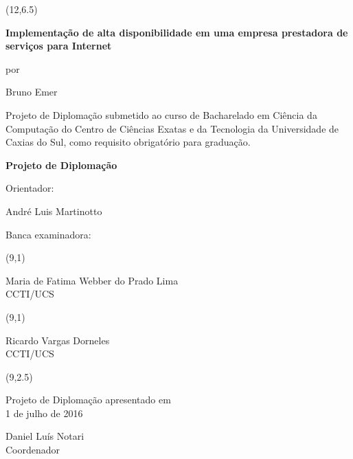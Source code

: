 \begin{titlepage}
\vfill

\begin{center}
{\setlength{\unitlength}{1cm}\makebox(12,6.5){\parbox[c]{12cm}{\setlength{\parskip}{0.8cm}\center\vskip -1.2cm\LARGE{\bf Implementação de alta disponibilidade em uma empresa prestadora de serviços para Internet}\par \normalsize por\par \large Bruno Emer\par}}}
\end{center}

{\large Projeto de Diplomação submetido ao curso de Bacharelado em Ciência da Computação do Centro de Ciências Exatas e da Tecnologia da Universidade de Caxias do Sul, como requisito obrigatório para graduação.}

\vfill

\begin{center}
{\Large\bf Projeto de Diplomação}
\end{center}

\vfill

\begin{singlespace}
Orientador: {André Luis Martinotto\par}

Banca examinadora:\par
\hspace{1cm} {\setlength{\unitlength}{1cm}
\makebox(9,1){\parbox[c]{9cm}{\center Maria de Fatima Webber do Prado Lima\\ CCTI/UCS}}}\par
\hspace{1cm} {\setlength{\unitlength}{1cm}
\makebox(9,1){\parbox[c]{9cm}{\center Ricardo Vargas Dorneles\\ CCTI/UCS}}}\par

\vfill

\hfill{\setlength{\unitlength}{1cm}\makebox(9,2.5){\parbox[c]{9cm}{\setlength{\parskip}{0.8cm}\center\vskip -1.2cm Projeto de Diplomação 
apresentado em\\ 1 de julho de 2016\par Daniel Luís Notari\\ Coordenador}}}

\end{singlespace}

\end{titlepage}
